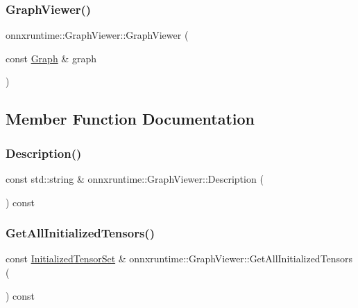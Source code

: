 \subsubsection{\texorpdfstring{Graph\+Viewer()}{GraphViewer()}}
{\footnotesize\ttfamily onnxruntime\+::\+Graph\+Viewer\+::\+Graph\+Viewer (\begin{DoxyParamCaption}\item[{const \mbox{\hyperlink{classonnxruntime_1_1Graph}{Graph}} \&}]{graph }\end{DoxyParamCaption})}



\subsection{Member Function Documentation}
\mbox{\label{classonnxruntime_1_1GraphViewer_a1d74a922adecb9759a4aa7ad79b944b5}} 
\subsubsection{\texorpdfstring{Description()}{Description()}}
{\footnotesize\ttfamily const std\+::string \& onnxruntime\+::\+Graph\+Viewer\+::\+Description (\begin{DoxyParamCaption}{ }\end{DoxyParamCaption}) const\hspace{0.3cm}{\ttfamily [noexcept]}}

\mbox{\label{classonnxruntime_1_1GraphViewer_a59a4a35d0f17ba72ac2ce572b44ece72}} 
\subsubsection{\texorpdfstring{Get\+All\+Initialized\+Tensors()}{GetAllInitializedTensors()}}
{\footnotesize\ttfamily const \mbox{\hyperlink{namespaceonnxruntime_a80c06ce917adca79f4a9c0f9ad3147f8}{Initialized\+Tensor\+Set}} \& onnxruntime\+::\+Graph\+Viewer\+::\+Get\+All\+Initialized\+Tensors (\begin{DoxyParamCaption}{ }\end{DoxyParamCaption}) const\hspace{0.3cm}{\ttfamily [noexcept]}}

